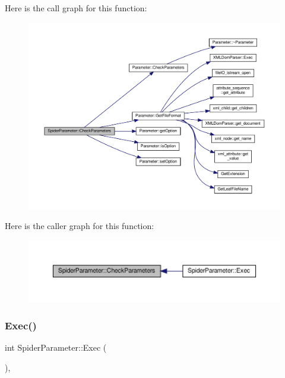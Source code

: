 Here is the call graph for this function\+:
\nopagebreak
\begin{figure}[H]
\begin{center}
\leavevmode
\includegraphics[width=350pt]{dc/d95/classSpiderParameter_a8e06c5f840c91a5207444d4f3fad6663_cgraph}
\end{center}
\end{figure}
Here is the caller graph for this function\+:
\nopagebreak
\begin{figure}[H]
\begin{center}
\leavevmode
\includegraphics[width=350pt]{dc/d95/classSpiderParameter_a8e06c5f840c91a5207444d4f3fad6663_icgraph}
\end{center}
\end{figure}
\mbox{\label{classSpiderParameter_a88ccb6e00f3a60b59e6ecb82e3f1b76d}} 
\subsubsection{\texorpdfstring{Exec()}{Exec()}}
{\footnotesize\ttfamily int Spider\+Parameter\+::\+Exec (\begin{DoxyParamCaption}{ }\end{DoxyParamCaption})\hspace{0.3cm}{\ttfamily [override]}, {\ttfamily [virtual]}}



